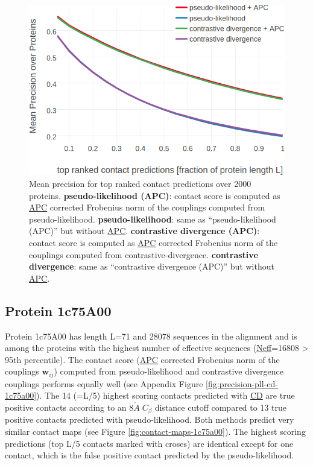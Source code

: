 \documentclass[11pt,a4paper,twoside]{book}
\newcommand{\Cb}{C_\beta}
\newcommand{\wij}{\mathbf{w}_{ij}}
\newcommand{\angstrom}{\mathring{A} \;}
\theoremstyle{definition}
\theoremstyle{definition}
\theoremstyle{remark}
\begin{document}
\begin{figure}

{\centering \includegraphics[width=0.9\linewidth]{img/full_likelihood/final/precision_vs_rank_notitle} 

}

\caption{Mean precision for top ranked contact
predictions over 2000 proteins. \textbf{pseudo-likelihood (APC)}:
contact score is computed as \protect\hyperlink{abbrev}{APC} corrected
Frobenius norm of the couplings computed from pseudo-likelihood.
\textbf{pseudo-likelihood}: same as ``pseudo-likelihood (APC)'' but
without \protect\hyperlink{abbrev}{APC}. \textbf{contrastive divergence
(APC)}: contact score is computed as \protect\hyperlink{abbrev}{APC}
corrected Frobenius norm of the couplings computed from
contrastive-divergence. \textbf{contrastive divergence}: same as
``contrastive divergence (APC)'' but without
\protect\hyperlink{abbrev}{APC}.}\label{fig:precision-cd-final}
\end{figure}

\subsection{Protein 1c75A00}\label{protein-1c75a00}

Protein 1c75A00 has length L=71 and 28078 sequences in the alignment and
is among the proteins with the highest number of effective sequences
(\protect\hyperlink{abbrev}{Neff}=16808 \textgreater{} 95th percentile).
The contact score (\protect\hyperlink{abbrev}{APC} corrected Frobenius
norm of the couplings \(\wij\)) computed from pseudo-likelihood and
contrastive divergence couplings performs equally well (see Appendix
Figure \ref{fig:precision-pll-cd-1c75a00}). The 14 (=L/5) highest
scoring contacts predicted with \protect\hyperlink{abbrev}{CD} are true
positive contacts according to an \(8 \angstrom \Cb\) distance cutoff
compared to 13 true positive contacts predicted with pseudo-likelihood.
Both methods predict very similar contact maps (see Figure
\ref{fig:contact-maps-1c75a00}). The highest scoring predictions (top
L/5 contacts marked with croses) are identical except for one contact,
which is the false positive contact predicted by the pseudo-likelihood.
\end{document}
